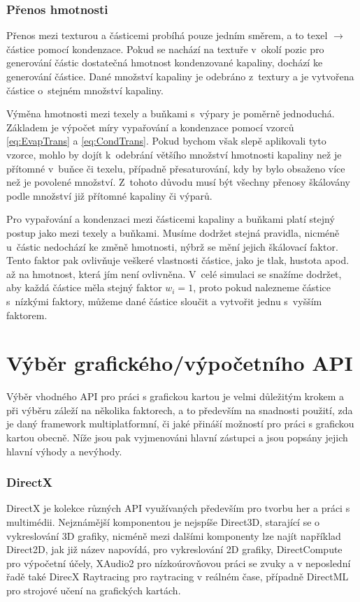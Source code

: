 \subsubsection{Přenos hmotnosti}
Přenos mezi texturou a částicemi probíhá pouze jedním směrem, a to texel $\rightarrow$ částice pomocí kondenzace. Pokud se nachází na textuře v~okolí pozic pro generování částic dostatečná hmotnost kondenzované kapaliny, dochází ke generování částice. Dané množství kapaliny je odebráno z~textury a je vytvořena částice o~stejném množství kapaliny.

Výměna hmotnosti mezi texely a buňkami s~výpary je poměrně jednoduchá. Základem je výpočet míry vypařování a kondenzace pomocí vzorců \ref{eq:EvapTrans} a \ref{eq:CondTrans}. Pokud bychom však slepě aplikovali tyto vzorce, mohlo by dojít k~odebrání většího množství hmotnosti kapaliny než je přítomné v~buňce či texelu, případně přesaturování, kdy by bylo obsaženo více než je povolené množství. Z~tohoto důvodu musí být všechny přenosy škálovány podle množství již přítomné kapaliny či výparů.

Pro vypařování a kondenzaci mezi částicemi kapaliny a buňkami platí stejný postup jako mezi texely a buňkami. Musíme dodržet stejná pravidla, nicméně u~částic nedochází ke změně hmotnosti, nýbrž se mění jejich škálovací faktor. Tento faktor pak ovlivňuje veškeré vlastnosti částice, jako je tlak, hustota apod. až na hmotnost, která jím není ovlivněna. V~celé simulaci se snažíme dodržet, aby každá částice měla stejný faktor $w_i = 1$, proto pokud nalezneme částice s~nízkými faktory, můžeme dané částice sloučit a vytvořit jednu s~vyšším faktorem.

\section{Výběr grafického/výpočetního API}
Výběr vhodného API pro práci s grafickou kartou je velmi důležitým krokem a při výběru záleží na několika faktorech, a to především na snadnosti použití, zda je daný framework multiplatformní, či jaké přináší možností pro práci s grafickou kartou obecně. Níže jsou pak vyjmenováni hlavní zástupci a jsou popsány jejich hlavní výhody a nevýhody.
\subsubsection{DirectX}
DirectX je kolekce různých API využívaných především pro tvorbu her a práci s multimédii. Nejznámější komponentou je nejspíše Direct3D, starající se o vykreslování 3D grafiky, nicméně mezi dalšími komponenty lze najít například Direct2D, jak již název napovídá, pro vykreslování 2D grafiky, DirectCompute pro výpočetní účely, XAudio2 pro nízkoúrovňovou práci se zvuky a v neposlední řadě také DirecX Raytracing pro raytracing v reálném čase, případně DirectML pro strojové učení na grafických kartách.

